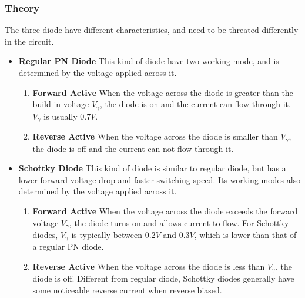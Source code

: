     \subsubsection{Theory}
    The three diode have different characteristics, and need to be threated differently in the circuit.\par
    \begin{itemize}
        \item \textbf{Regular PN Diode}
            This kind of diode have two working mode, and is determined by the voltage applied across it. 
            \begin{enumerate}
                \item \textbf{Forward Active}\newline
                    When the voltage across the diode is greater than the build in voltage $V_{\gamma}$, the diode is on and the current can flow through it. $V_{\gamma}$ is usually $0.7V$.
                \item \textbf{Reverse Active}\newline
                    When the voltage across the diode is smaller than $V_{\gamma}$, the diode is off and the current can not flow through it.
            \end{enumerate}
    
        \item \textbf{Schottky Diode}
            This kind of diode is similar to regular diode, but has a lower forward voltage drop and faster switching speed. Its working modes also determined by the voltage applied across it.
            \begin{enumerate}
                \item \textbf{Forward Active}\newline
                    When the voltage across the diode exceeds the forward voltage $V_{\gamma}$, the diode turns on and allows current to flow. For Schottky diodes, $V_{\gamma}$ is typically between $0.2V$ and $0.3V$, which is lower than that of a regular PN diode.

                \item \textbf{Reverse Active}\newline
                    When the voltage across the diode is less than $V_{\gamma}$, the diode is off. Different from regular diode, Schottky diodes generally have some noticeable reverse current when reverse biased.
            \end{enumerate}
        

\end{itemize}
